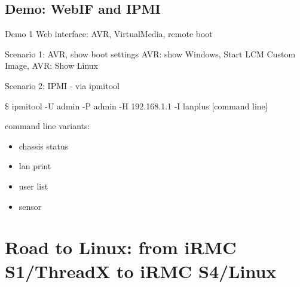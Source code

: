 \documentclass{beamer}
\begin{document}
  \subsection{Demo: WebIF and IPMI}
  \begin{frame}{Demo 1}
	  Web interface:  AVR, VirtualMedia, remote boot

	  \begin{block}{Scenario 1: AVR, show boot settings}
		  AVR: show Windows, Start LCM Custom Image, AVR: Show Linux
	  \end{block}
	  \pause

	  \begin{block}{Scenario 2: IPMI - via ipmitool}

		  \small{\$ ipmitool -U admin -P admin -H 192.168.1.1 -I lanplus [command line]} \newline

		  command line variants:
		  \begin{itemize}
			  \item chassis status
			  \item lan print
			  \item user list
			  \item sensor	
		  \end{itemize}

	  \end{block}

  \end{frame}

\section{Road to Linux: from iRMC S1/ThreadX to iRMC S4/Linux}
\end{document}
